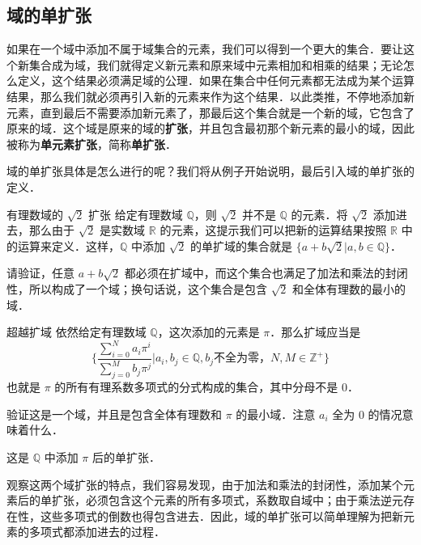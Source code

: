 

\subsection{域的单扩张}
如果在一个域中添加不属于域集合的元素，我们可以得到一个更大的集合．要让这个新集合成为域，我们就得定义新元素和原来域中元素相加和相乘的结果；无论怎么定义，这个结果必须满足域的公理．如果在集合中任何元素都无法成为某个运算结果，那么我们就必须再引入新的元素来作为这个结果．以此类推，不停地添加新元素，直到最后不需要添加新元素了，那最后这个集合就是一个新的域，它包含了原来的域．这个域是原来的域的\textbf{扩张}，并且包含最初那个新元素的最小的域，因此被称为\textbf{单元素扩张}，简称\textbf{单扩张}．

域的单扩张具体是怎么进行的呢？我们将从例子开始说明，最后引入域的单扩张的定义．

\begin{exercise}{有理数域的 $\sqrt{2}$ 扩张}\label{FldExp_exe1}
给定有理数域 $\mathbb{Q}$，则 $\sqrt{2}$ 并不是 $\mathbb{Q}$ 的元素．将 $\sqrt{2}$ 添加进去，那么由于 $\sqrt{2}$ 是实数域 $\mathbb{R}$ 的元素，这提示我们可以把新的运算结果按照 $\mathbb{R}$ 中的运算来定义．这样，$\mathbb{Q}$ 中添加 $\sqrt{2}$ 的单扩域的集合就是 $\{a+b\sqrt{2}|a, b\in\mathbb{Q}\}$．

请验证，任意 $a+b\sqrt{2}$ 都必须在扩域中，而这个集合也满足了加法和乘法的封闭性，所以构成了一个域；换句话说，这个集合是包含 $\sqrt{2}$ 和全体有理数的最小的域．
\end{exercise}

\begin{exercise}{超越扩域}\label{FldExp_exe2}
依然给定有理数域 $\mathbb{Q}$，这次添加的元素是 $\pi$．那么扩域应当是
\begin{equation}
\{\frac{\sum_{i=0}^N a_i\pi^i}{\sum_{j=0}^M b_j\pi^j}|a_i, b_j\in\mathbb{Q}, b_j\text{不全为零，} N, M\in\mathbb{Z}^+\}
\end{equation}
也就是 $\pi$ 的所有有理系数多项式的分式构成的集合，其中分母不是 $0$．

验证这是一个域，并且是包含全体有理数和 $\pi$ 的最小域．注意 $a_i$ 全为 $0$ 的情况意味着什么．

这是 $\mathbb{Q}$ 中添加 $\pi$ 后的单扩张．
\end{exercise}

观察这两个域扩张的特点，我们容易发现，由于加法和乘法的封闭性，添加某个元素后的单扩张，必须包含这个元素的所有多项式，系数取自域中；由于乘法逆元存在性，这些多项式的倒数也得包含进去．因此，域的单扩张可以简单理解为把新元素的多项式都添加进去的过程．

